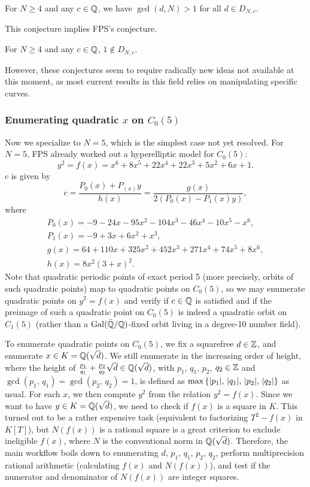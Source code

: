 \begin{conjecture}
  For $N \ge 4$ and any $c \in \mathbb{Q}$, we have $\gcd(d, N) > 1$ for all
  $d \in D_{N,c}$.
\end{conjecture}

This conjecture implies FPS's conjecture.

\begin{conjecture}[FPS]
  For $N \ge 4$ and any $c \in \mathbb{Q}$, $1 \not\in D_{N,c}$.
\end{conjecture}

However, these conjectures seem to require radically new ideas not
available at this moment, as most current results in this field relies
on manipulating specific curves.

\subsubsection{Enumerating quadratic $x$ on $C_0(5)$}

Now we specialize to $N = 5$, which is the simplest case not yet
resolved. For $N = 5$, FPS already worked out a hyperelliptic model
for $C_0(5)$:
\[
y^2 = f(x) = x^6 + 8x^5 + 22x^4 + 22x^3 + 5x^2 + 6x + 1.
\]
$c$ is given by
\[
c = \frac{P_0(x) + P_(x) y}{h(x)} = \frac{g(x)}{2(P_0(x) - P_1(x) y)},
\]
where
\[
\begin{gathered}
  P_0(x) = - 9 - 24x - 95x^2 - 104x^3 - 46x^4 - 10x^5 - x^6,\\
  P_1(x) = - 9 + 3x + 6x^2 + x^3,\\
  g(x) = 64 + 110x + 325x^2 + 452x^3 + 271x^4 + 74x^5 + 8x^6,\\
  h(x) = 8x^2(3 + x)^2.
\end{gathered}
\]
Note that quadratic periodic points of exact period 5 (more precisely,
orbits of such quadratic points) map to quadratic points on $C_0(5)$,
so we may enumerate quadratic points on $y^2 = f(x)$ and verify if $c
\in \mathbb{Q}$ is satisfied and if the preimage of such a quadratic point on
$C_0(5)$ is indeed a quadratic orbit on $C_1(5)$ (rather than a
$\mathrm{Gal}(\bar{\mathbb{Q}}/\mathbb{Q})$-fixed orbit living in a degree-10 number field).

To enumerate quadratic points on $C_0(5)$, we fix a squarefree $d \in
\mathbb{Z}$, and enumerate $x \in K = \mathbb{Q}(\sqrt{d})$. We still enumerate in the
increasing order of height, where the height of $\frac{p_1}{q_1} +
\frac{p_2}{q_2} \sqrt{d} \in \mathbb{Q}(\sqrt{d})$, with $p_1$, $q_1$, $p_2$,
$q_2 \in \mathbb{Z}$ and $\gcd(p_1,\, q_1) = \gcd(p_2,\, q_2) = 1$, is defined
as $\max\left\{|p_1|,\, |q_1|,\, |p_2|,\, |q_2|\right\}$ as usual. For each
$x$, we then compute $y^2$ from the relation $y^2 = f(x)$. Since we
want to have $y \in K = \mathbb{Q}(\sqrt{d})$, we need to check if $f(x)$ is a
square in $K$. This turned out to be a rather expensive task
(equivalent to factorizing $T^2 - f(x)$ in $K[T]$), but $N(f(x))$ is a
rational square is a great criterion to exclude ineligible $f(x)$,
where $N$ is the conventional norm in $\mathbb{Q}(\sqrt{d})$. Therefore, the
main workflow boils down to enumerating $d$, $p_1$, $q_1$, $p_2$,
$q_2$, perform multiprecision rational arithmetic (calculating $f(x)$
and $N(f(x))$), and test if the numerator and denominator of $N(f(x))$
are integer squares.

